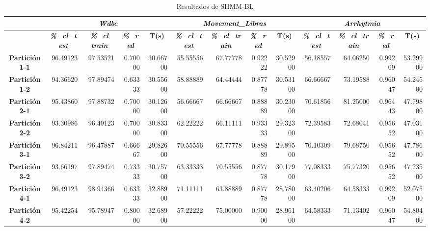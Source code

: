 \documentclass[a4paper,11pt]{article}
\begin{document}
  \begin{table}[H]	
  \caption{Resultados de SHMM-BL}
  \begin{adjustbox}{width=1.1\textwidth}
 \begin{tabular}{|c|r|r|r|r|r|r|r|r|r|r|r|r|}
  \hline
  \multicolumn{1}{|l|}{} & \multicolumn{ 4}{c|}{\textbf{\textit{Wdbc}}} & \multicolumn{ 4}{c|}{\textbf{\textit{Movement\_Libras}}} & \multicolumn{ 4}{c|}{\textbf{\textit{Arrhytmia}}} \\ \hline
  \multicolumn{1}{|l|}{} & \multicolumn{1}{c|}{\textbf{\textit{\%\_cl\_test}}} & \multicolumn{1}{c|}{\textbf{\textit{\%\_cl train}}} & \multicolumn{1}{c|}{\textbf{\textit{\%\_red}}} & \multicolumn{1}{c|}{\textbf{T(s)}} & \multicolumn{1}{c|}{\textbf{\textit{\%\_cl\_test}}} & \multicolumn{1}{c|}{\textbf{\textit{\%\_cl\_train}}} & \multicolumn{1}{c|}{\textbf{\textit{\%\_red}}} & \multicolumn{1}{c|}{\textbf{T(s)}} & \multicolumn{1}{c|}{\textbf{\textit{\%\_cl\_test}}} & \multicolumn{1}{c|}{\textbf{\textit{\%\_cl\_train}}} & \multicolumn{1}{c|}{\textbf{\textit{\%\_red}}} & \multicolumn{1}{c|}{\textbf{T(s)}} \\ \hline
  \textbf{Partición 1-1} & 96.49123 & 97.53521 & 0.70000 & 30.66700 & 55.55556 & 67.77778 & 0.92222 & 30.52900 & 56.18557 & 64.06250 & 0.99209 & 53.29900 \\ \hline
  \textbf{Partición 1-2} & 94.36620 & 97.89474 & 0.63333 & 30.55600 & 58.88889 & 64.44444 & 0.87778 & 30.53100 & 66.66667 & 73.19588 & 0.96047 & 54.24500 \\ \hline
  \textbf{Partición 2-1} & 95.43860 & 97.88732 & 0.70000 & 30.12600 & 56.66667 & 66.66667 & 0.88889 & 30.23000 & 70.61856 & 81.25000 & 0.96443 & 47.79800 \\ \hline
  \textbf{Partición 2-2} & 93.30986 & 96.49123 & 0.70000 & 30.83300 & 62.22222 & 66.11111 & 0.93333 & 29.32300 & 72.39583 & 72.68041 & 0.95652 & 47.03100 \\ \hline
  \textbf{Partición 3-1} & 96.84211 & 96.47887 & 0.66667 & 29.82600 & 70.55556 & 67.77778 & 0.88889 & 29.89500 & 70.10309 & 79.68750 & 0.95652 & 47.78600 \\ \hline
  \textbf{Partición 3-2} & 93.66197 & 97.89474 & 0.73333 & 30.75700 & 63.33333 & 70.55556 & 0.87778 & 30.17900 & 77.08333 & 75.77320 & 0.95652 & 47.23500 \\ \hline
  \textbf{Partición 4-1} & 96.49123 & 98.94366 & 0.63333 & 32.88900 & 71.11111 & 63.88889 & 0.87778 & 28.78000 & 63.40206 & 64.58333 & 0.99209 & 52.07500 \\ \hline
  \textbf{Partición 4-2} & 95.42254 & 95.78947 & 0.80000 & 32.68900 & 57.22222 & 75.00000 & 0.90000 & 28.96100 & 64.58333 & 71.13402 & 0.96047 & 54.80400 \\ \hline

\end{tabular}
\end{adjustbox}
\end{table}
\end{document}

